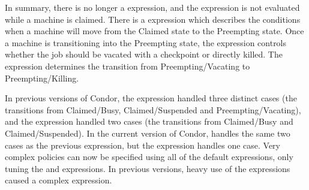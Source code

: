 In summary, there is no longer a  expression, and the
 expression is not evaluated while a machine is claimed. 
There is a  expression which describes the
conditions when a machine will move from the Claimed state to the
Preempting state.
Once a machine is transitioning into the Preempting state, the
 expression controls whether the job should
be vacated with a checkpoint or directly killed.
The  expression determines the transition from
Preempting/Vacating to Preempting/Killing.  

In previous versions of Condor,
the  expression handled three distinct cases
(the transitions from Claimed/Busy, Claimed/Suspended and
Preempting/Vacating), and the  expression handled
two cases (the transitions from Claimed/Busy and Claimed/Suspended).
In the current version of Condor,  handles the
same two cases as the previous  expression,
but the  expression handles one case.
Very complex policies can now be specified using all of
the default expressions, only tuning the  and
 expressions.
In previous versions, heavy use of the 
expressions caused a complex  expression.
